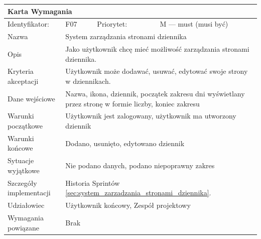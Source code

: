 \documentclass[a4paper,11pt]{report}
\begin{document}
		\begin{tabular}{|p{3cm}|p{2cm}|p{2cm}|p{6cm}|}
		\hline
		\multicolumn{4}{|p{12 cm}|}{Karta Wymagania}\\
		\hline
		Identyfikator: & F07 & Priorytet: & M — must (musi być)\\
		\hline
		Nazwa & \multicolumn{3}{|p{10 cm}|}{System zarządzania stronami dziennika}\\
		\hline
		Opis & \multicolumn{3}{|p{10 cm}|}{Jako użytkownik chcę mieć możliwość zarządzania stronami dziennika.}\\
		\hline
		Kryteria akceptacji & \multicolumn{3}{|p{10 cm}|}{Użytkownik może dodawać, usuwać, edytować swoje strony w dziennikach.}\\
		\hline
		Dane wejściowe & \multicolumn{3}{|p{10 cm}|}{Nazwa, ikona, dziennik, początek zakresu dni wyświetlany przez stronę w formie liczby, koniec zakresu}\\
		\hline
		Warunki początkowe & \multicolumn{3}{|p{10 cm}|}{Użytkownik jest zalogowany, użytkownik ma utworzony dziennik}\\
		\hline
		Warunki końcowe & \multicolumn{3}{|p{10 cm}|}{Dodano, usunięto, edytowano dziennik}\\
		\hline
		Sytuacje wyjątkowe & \multicolumn{3}{|p{10 cm}|}{Nie podano danych, podano niepoprawny zakres}\\
		\hline
		Szczegóły implementacji & \multicolumn{3}{|p{10 cm}|}{Historia Sprintów \ref{sec:system_zarzadzania_stronami_dziennika}.}\\
		\hline
		Udziałowiec & \multicolumn{3}{|p{10 cm}|}{Użytkownik końcowy, Zespół projektowy}\\
		\hline
		Wymagania powiązane & \multicolumn{3}{|p{10 cm}|}{Brak}\\
		\hline
		\end{tabular}\\
		\newline
		\vspace*{0,2 cm}
		\newline
\end{document}
